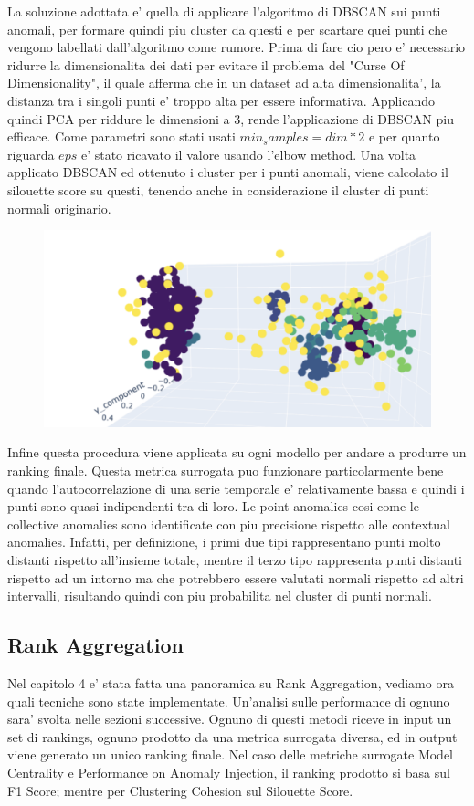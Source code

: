 La soluzione adottata e' quella di applicare l'algoritmo di DBSCAN sui punti anomali, per formare quindi piu cluster da questi e per scartare quei punti che vengono labellati dall'algoritmo come rumore.
Prima di fare cio pero e' necessario ridurre la dimensionalita dei dati per evitare il problema del "Curse Of Dimensionality", il quale afferma che in un dataset ad alta dimensionalita', la distanza tra i singoli punti e' troppo alta per essere informativa.
Applicando quindi PCA per riddure le dimensioni a 3, rende l'applicazione di DBSCAN piu efficace. Come parametri sono stati usati $min_samples=dim * 2$ e per quanto riguarda $eps$ e' stato ricavato il valore usando l'elbow method.
Una volta applicato DBSCAN ed ottenuto i cluster per i punti anomali, viene calcolato il silouette score su questi, tenendo anche in considerazione il cluster di punti normali originario.
\begin{figure}[t]
\includegraphics[width=14cm, scale=1]{images/plot-dbscan-anomalies}
\centering
\end{figure}
Infine questa procedura viene applicata su ogni modello per andare a produrre un ranking finale.
Questa metrica surrogata puo funzionare particolarmente bene quando l'autocorrelazione di una serie temporale e' relativamente bassa e quindi i punti sono quasi indipendenti tra di loro. Le point anomalies cosi come le collective anomalies sono identificate con piu precisione rispetto alle contextual anomalies. Infatti, per definizione, i primi due tipi rappresentano punti molto distanti rispetto all'insieme totale, mentre il terzo tipo rappresenta punti distanti rispetto ad un intorno ma che potrebbero essere valutati normali rispetto ad altri intervalli, risultando quindi con piu probabilita nel cluster di punti normali.
\subsection{Rank Aggregation}
Nel capitolo 4 e' stata fatta una panoramica su Rank Aggregation, vediamo ora quali tecniche sono state implementate. Un'analisi sulle performance di ognuno sara' svolta nelle sezioni successive.
Ognuno di questi metodi riceve in input un set di rankings, ognuno prodotto da una metrica surrogata diversa, ed in output viene generato un unico ranking finale.
Nel caso delle metriche surrogate Model Centrality e Performance on Anomaly Injection, il ranking prodotto si basa sul F1 Score; mentre per Clustering Cohesion sul Silouette Score.
